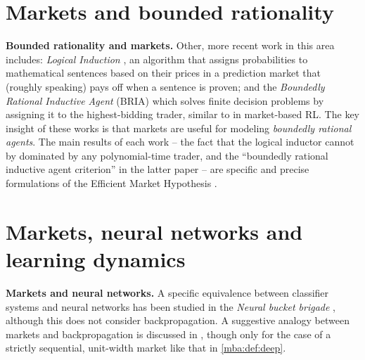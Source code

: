 \section{Markets and bounded rationality}\label{litrev:sec:bounded}
\textbf{Bounded rationality and markets.} Other, more recent work in this area includes: \emph{Logical Induction} \citep{garrabrantLogicalInduction2020}, an algorithm that assigns probabilities to mathematical sentences based on their prices in a prediction market that (roughly speaking) pays off when a sentence is proven; and the \emph{Boundedly Rational Inductive Agent} (BRIA) \citep{oesterheldTheoryBoundedInductive2023} which solves finite decision problems by assigning it to the highest-bidding trader, similar to in market-based RL. The key insight of these works is that markets are useful for modeling \emph{boundedly rational agents}. The main results of each work -- the fact that the logical inductor cannot by dominated by any polynomial-time trader, and the ``boundedly rational inductive agent criterion'' in the latter paper -- are specific and precise formulations of the Efficient Market Hypothesis \citep{neymanAlgorithmicBayesianEpistemology2024}.

\section{Markets, neural networks and learning dynamics}\label{litrev:sec:nn}
\textbf{Markets and neural networks.} A specific equivalence between classifier systems and neural networks has been studied in the \emph{Neural bucket brigade} \citep{davisMappingClassifierSystems1988, schmidhuberLocalLearningAlgorithm1989}, although this does not consider backpropagation. A suggestive analogy between markets and backpropagation is discussed in \citet{wentworthCompetitiveMarketsDistributed2018}, though only for the case of a strictly sequential, unit-width market like that in \cref{mba:def:deep}. 



